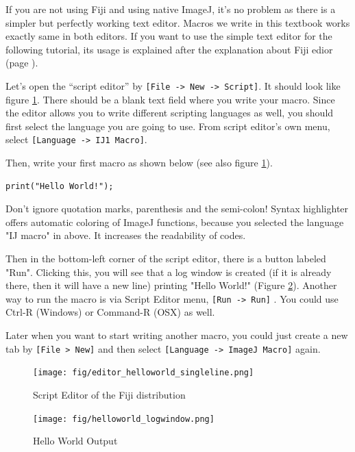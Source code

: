 \documentclass[11pt,a4paper,oneside]{report}
\newcommand{\ijmenu}[1]{\texttt{\small#1}}
\begin{document}
If you are not using Fiji and using native ImageJ, it's no problem as there is a simpler but perfectly working text editor. Macros we write in this textbook works exactly same in both editors. If you want to use the simple text editor for the following tutorial, its usage is explained after the explanation about Fiji edior (page \pageref{part:nativeeditor}).   

Let's open the ``script editor'' 
by \ijmenu{[File -> New -> Script]}. It should look like figure \ref{fig_ScriptEditor}.
There should be a blank text field where you write your macro. Since the editor allows you to write different scripting languages as well, you should first select the language you are going to use.  
From script editor's own menu, select \ijmenu{[Language -> IJ1 Macro]}. 

Then, write your first macro as shown below (see also figure \ref{fig_ScriptEditor}). \\
\begin{lstlisting}[numbers=none]
print("Hello World!");
\end{lstlisting}

Don't ignore quotation marks, parenthesis and the semi-colon! 
Syntax highlighter offers automatic coloring of ImageJ functions, because you selected the language "IJ macro" in above. It increases the readability of codes. 

Then in the bottom-left corner of the script editor, there is a button labeled "Run". Clicking this, you will see that a log window is created (if it is already there, then it will have a new line) printing "Hello World!" (Figure \ref{fig_HelloWorldLog}). Another way to run the macro is via Script Editor menu,  \ijmenu{[Run -> Run]} . You could use Ctrl-R (Windows) or Command-R (OSX) as well.  

Later when you want to start writing another macro, you could just create a new tab by \ijmenu{[File > New]} and then select \ijmenu{[Language -> ImageJ Macro]} again.

\begin{figure}[hbtp]
\begin{center}
\texttt{[image: fig/editor\_helloworld\_singleline.png]}
\caption{Script Editor of the Fiji distribution} \label{fig_ScriptEditor}
\end{center}
\end{figure}

\begin{figure}[hbtp]
\begin{center}
\texttt{[image: fig/helloworld\_logwindow.png]}
\caption{Hello World Output} \label{fig_HelloWorldLog}
\end{center}
\end{figure}
\end{document}
